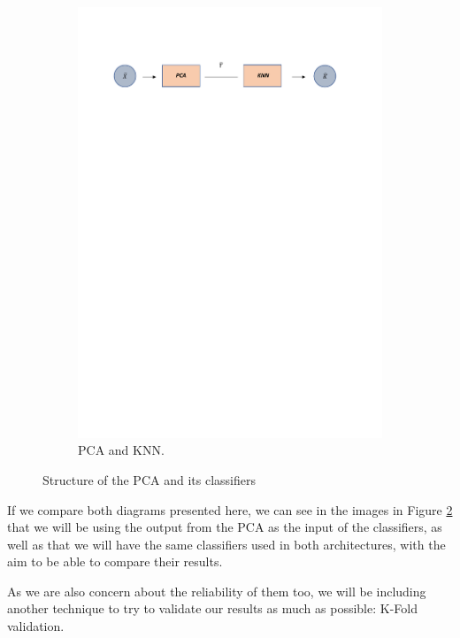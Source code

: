 \begin{figure}[H]
\begin{subfigure}{1\linewidth} 
  \centering
  \includegraphics[width=\linewidth]{Figuras_tfg/Diagram_pca_KNN}
  \caption{PCA and KNN.}
  \label{fig:FigB_PCA_KNN} 
\end{subfigure}
  \caption{Structure of the PCA and its classifiers}
 \label{fig:PCA_architecture}
\end{figure}

If we compare both diagrams presented here, we can see in the images in Figure \ref{fig:PCA_architecture} that we will be using the output from the PCA as the input of the classifiers, as well as that we will have the same classifiers used in both architectures, with the aim to be able to compare their results.\par

As we are also concern about the reliability of them too, we will be including another technique to try to validate our results as much as possible: K-Fold validation. \par


